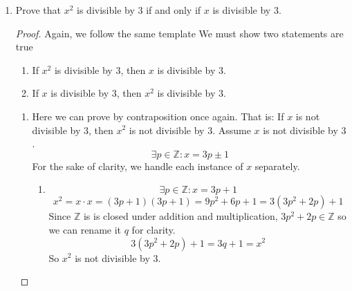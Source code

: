 \documentclass[12pt,letterpaper]{article}
\begin{document}
\begin{enumerate}
\begin{enumerate}
\begin{proof}
                By $i$ and $ii$, we have shown both cases and thus
                $x^2$ is even if and only if $x$ is even. \\

            \end{proof}

        \pagebreak

        \item Prove that $x^2$ is divisible by $3$ if and only if
              $x$ is divisible by $3$.

            \begin{proof}
                Again, we follow the same template
                We must show two statements are true
                \begin{enumerate}
                    \item If $x^2$ is divisible by $3$, then $x$ is divisible by $3$.
                    \item If $x$ is divisible by $3$, then $x^2$ is divisible by $3$.
                \end{enumerate}

                \begin{enumerate}
                    \item
                        Here we can prove by contraposition once again.
                        That is:
                        If $x$ is not divisible by $3$,
                        then $x^2$ is not divisible by $3$.
                        Assume $x$ is not divisible by $3$.
                        \[\exists p \in \mathbb{Z} : x = 3p \pm 1\]
                        For the sake of clarity,
                        we handle each instance of $x$ separately.
                        \begin{enumerate}
                            \item
                                \[\exists p \in \mathbb{Z} : x = 3p + 1\]
                                \[
                                    x^2 = x \cdot x = (3p + 1)(3p + 1) =
                                    9p^2 + 6p + 1 = 3(3p^2 + 2p) + 1
                                \]
                                Since $\mathbb{Z}$ is is closed under
                                addition and multiplication,
                                $3p^2 + 2p \in \mathbb{Z}$ so we can rename it $q$
                                for clarity.
                                \[3(3p^2 + 2p) + 1 = 3q + 1 = x^2\]
                                So $x^2$ is not divisible by $3$.


\end{enumerate}
\end{enumerate}
\end{proof}
\end{enumerate}
\end{enumerate}
\end{document}

